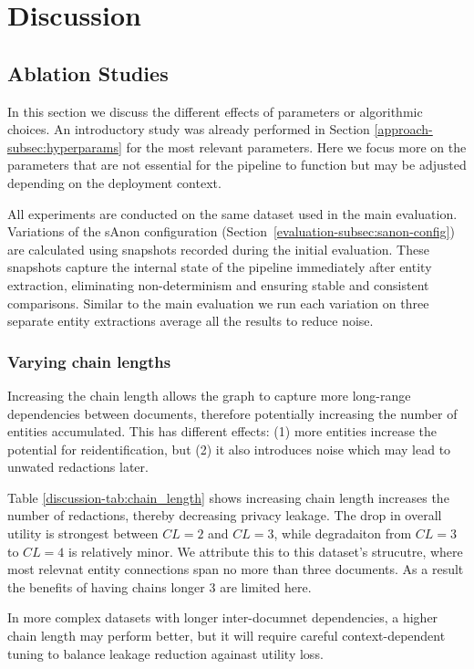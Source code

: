 \chapter{Discussion}\label{chapter:discussion}
\section{Ablation Studies}
In this section we discuss the different effects of parameters or algorithmic choices. An introductory study was already performed in Section \ref{approach-subsec:hyperparams} for the most relevant parameters. Here we focus more on the parameters that are not essential for the pipeline to function  but may be adjusted depending on the deployment context.  

All experiments are conducted on the same dataset used in the main evaluation. Variations of the sAnon configuration (Section~\ref{evaluation-subsec:sanon-config}) are calculated using snapshots recorded during the initial evaluation. These snapshots capture the internal state of the pipeline immediately after entity extraction, eliminating non-determinism and ensuring stable and consistent comparisons.  Similar to the main evaluation we run each variation on three separate entity extractions average all the results to reduce noise.


\subsection{Varying chain lengths}
Increasing the chain length allows the graph to capture more long-range dependencies between documents, therefore potentially increasing the number of entities accumulated. This has different effects: (1) more entities increase the potential for reidentification, but (2) it also introduces noise which may lead to unwated redactions later.

Table \ref{discussion-tab:chain_length} shows increasing chain length increases the number of redactions, thereby decreasing privacy leakage. 
The drop in overall utility is strongest between $CL=2$ and $CL=3$, while degradaiton from  $CL=3$ to $CL=4$ is relatively minor. We attribute this to this dataset's strucutre, where most relevnat entity connections span no more than three documents. As a result the benefits of having chains longer 3 are limited here.

In more complex datasets with longer inter-documnet dependencies, a higher chain length may perform better, but it will require careful context-dependent tuning to balance leakage reduction againast utility loss.


